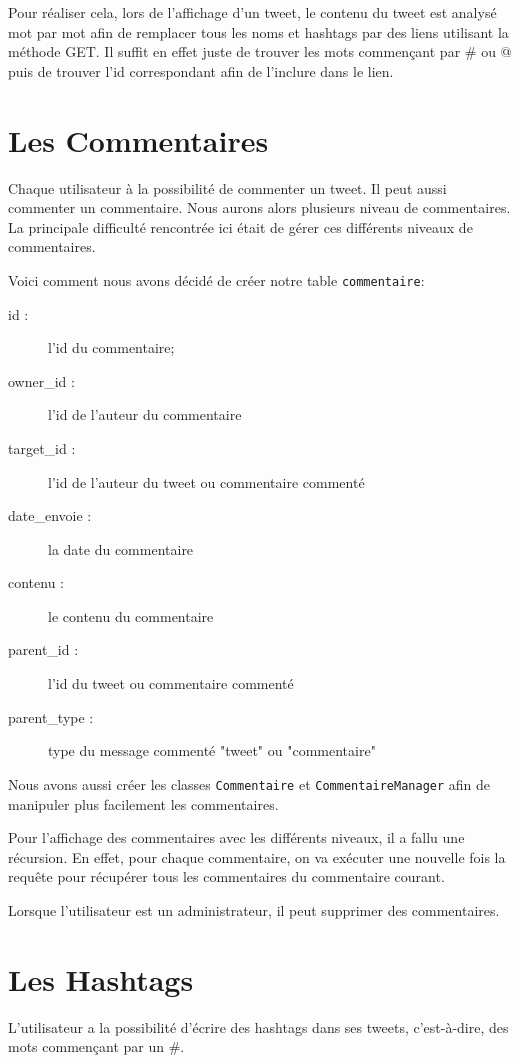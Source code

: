 \documentclass[a4paper, 12pt]{article}
\begin{document}
Pour réaliser cela, lors de l'affichage d'un tweet, le contenu du tweet est analysé mot par mot afin de remplacer tous les noms et hashtags par des liens utilisant la méthode GET. Il suffit en effet juste de trouver les mots commençant par \# ou @ puis de trouver l'id correspondant afin de l'inclure dans le lien.



\section{Les Commentaires}	
Chaque utilisateur à la possibilité de commenter un tweet. Il peut aussi commenter un commentaire. Nous aurons alors plusieurs niveau de commentaires. La principale difficulté rencontrée ici était de gérer ces différents niveaux de commentaires.

Voici comment nous avons décidé de créer notre table \texttt{commentaire}:
\begin{description}
\item[id :] l'id du commentaire;
\item[owner\_id :] l'id de l'auteur du commentaire
\item[target\_id :] l'id de l'auteur du tweet ou commentaire commenté
\item[date\_envoie :] la date du commentaire
\item[contenu :] le contenu du commentaire
\item[parent\_id :] l'id du tweet ou commentaire commenté
\item[parent\_type :] type du message commenté "tweet" ou "commentaire"
\end{description}
Nous avons aussi créer les classes \texttt{Commentaire} et \texttt{CommentaireManager} afin de manipuler plus facilement les commentaires.

Pour l'affichage des commentaires avec les différents niveaux, il a fallu une récursion. En effet, pour chaque commentaire, on va exécuter une nouvelle fois la requête pour récupérer tous les commentaires du commentaire courant.

Lorsque l'utilisateur est un administrateur, il peut supprimer des commentaires. 

\newpage
\section{Les Hashtags}		
L'utilisateur a la possibilité d'écrire des hashtags dans ses tweets, c'est-à-dire, des mots commençant par un \#. 
\end{document}
